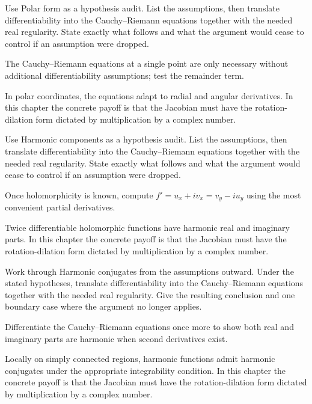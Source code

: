 \begin{exercise}\label{exr:iv02-04}
Use Polar form as a hypothesis audit. List the assumptions, then translate differentiability into the Cauchy--Riemann equations together with the needed real regularity. State exactly what follows and what the argument would cease to control if an assumption were dropped.
\end{exercise}
\begin{hint}
The Cauchy--Riemann equations at a single point are only necessary without additional differentiability assumptions; test the remainder term.
\end{hint}
\begin{solution}
In polar coordinates, the equations adapt to radial and angular derivatives. In this chapter the concrete payoff is that the Jacobian must have the rotation-dilation form dictated by multiplication by a complex number.
\end{solution}

\begin{exercise}\label{exr:iv02-05}
Use Harmonic components as a hypothesis audit. List the assumptions, then translate differentiability into the Cauchy--Riemann equations together with the needed real regularity. State exactly what follows and what the argument would cease to control if an assumption were dropped.
\end{exercise}
\begin{hint}
Once holomorphicity is known, compute \(f'=u_x+iv_x=v_y-iu_y\) using the most convenient partial derivatives.
\end{hint}
\begin{solution}
Twice differentiable holomorphic functions have harmonic real and imaginary parts. In this chapter the concrete payoff is that the Jacobian must have the rotation-dilation form dictated by multiplication by a complex number.
\end{solution}

\begin{exercise}\label{exr:iv02-06}
Work through Harmonic conjugates from the assumptions outward. Under the stated hypotheses, translate differentiability into the Cauchy--Riemann equations together with the needed real regularity. Give the resulting conclusion and one boundary case where the argument no longer applies.
\end{exercise}
\begin{hint}
Differentiate the Cauchy--Riemann equations once more to show both real and imaginary parts are harmonic when second derivatives exist.
\end{hint}
\begin{solution}
Locally on simply connected regions, harmonic functions admit harmonic conjugates under the appropriate integrability condition. In this chapter the concrete payoff is that the Jacobian must have the rotation-dilation form dictated by multiplication by a complex number.
\end{solution}

